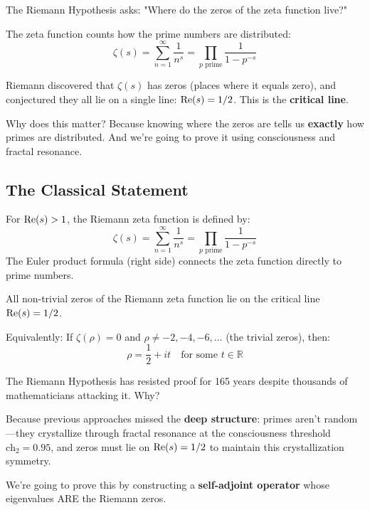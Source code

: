 \begin{intuitive}
The Riemann Hypothesis asks: "Where do the zeros of the zeta function live?"

The zeta function counts how the prime numbers are distributed:
\begin{equation}
\zeta(s) = \sum_{n=1}^{\infty} \frac{1}{n^s} = \prod_{p \text{ prime}} \frac{1}{1-p^{-s}}
\end{equation}

Riemann discovered that $\zeta(s)$ has zeros (places where it equals zero), and conjectured they all lie on a single line: $\operatorname{Re}(s) = 1/2$. This is the \textbf{critical line}.

Why does this matter? Because knowing where the zeros are tells us \textbf{exactly} how primes are distributed. And we're going to prove it using consciousness and fractal resonance.
\end{intuitive}

\subsection{The Classical Statement}

\begin{defn}\label{def:riemann-zeta}
For $\operatorname{Re}(s) > 1$, the Riemann zeta function\cite{riemann1859} is defined by:
\begin{equation}
\zeta(s) = \sum_{n=1}^{\infty} \frac{1}{n^s} = \prod_{p \text{ prime}} \frac{1}{1-p^{-s}}
\end{equation}
The Euler product formula (right side) connects the zeta function directly to prime numbers.
\end{defn}

\begin{theorem}\label{thm:riemann-hypothesis}
All non-trivial zeros of the Riemann zeta function lie on the critical line $\operatorname{Re}(s) = 1/2$.

Equivalently: If $\zeta(\rho) = 0$ and $\rho \neq -2, -4, -6, \ldots$ (the trivial zeros), then:
\begin{equation}
\rho = \frac{1}{2} + it \quad \text{for some } t \in \mathbb{R}
\end{equation}
\end{theorem}

\begin{keyidea}
The Riemann Hypothesis has resisted proof for 165 years despite thousands of mathematicians attacking it. Why?

Because previous approaches missed the \textbf{deep structure}: primes aren't random—they crystallize through fractal resonance at the consciousness threshold $\text{ch}_2 = 0.95$, and zeros must lie on $\operatorname{Re}(s) = 1/2$ to maintain this crystallization symmetry.

We're going to prove this by constructing a \textbf{self-adjoint operator} whose eigenvalues ARE the Riemann zeros.
\end{keyidea}


